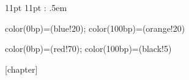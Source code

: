 \makeatletter
{}%
{11pt}%
{11pt}%
{}%
{}%
{\scshape}%
{:}%
{.5em}%
{}%
\makeatother

\theoremstyle{classicdef}
\newtheorem{theorem}{Teorema}[chapter]
\newtheorem{lemma}{Lemma}[chapter]
\newtheorem{definition}{Definizione}[chapter]
\newtheorem*{homework}{Homework}
\theoremstyle{remark}
\newtheorem*{remark}{Nota}
\renewcommand{\qedsymbol}{\rule{.5em}{.5em}}



{color(0bp)=(blue!20);
color(100bp)=(orange!20)}

{color(0bp)=(red!70);
color(100bp)=(black!5)}


\providecommand{\problemname}{Problem}
[chapter]
\setcounter{problem}{0}
\makeatletter
 \renewcommand{\theproblem}{%
\ifnum \c@chapter>\z@ \thechapter.\fi \@arabic\c@problem
}

